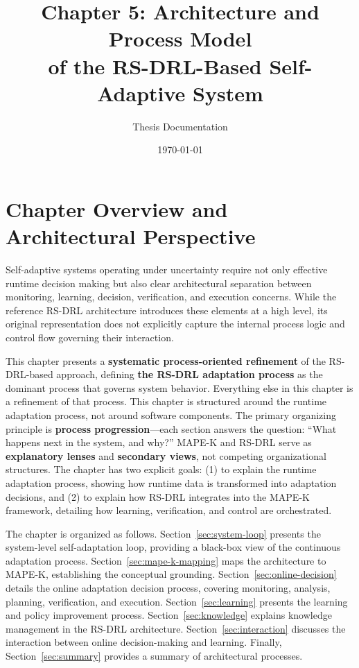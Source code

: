 \documentclass[11pt,a4paper]{article}
\title{Chapter 5: Architecture and Process Model\\of the RS-DRL-Based Self-Adaptive System}
\author{Thesis Documentation}
\date{\today}
\begin{document}
\maketitle


\section{Chapter Overview and Architectural Perspective}
\label{sec:overview}

Self-adaptive systems operating under uncertainty require not only effective runtime decision making but also clear architectural separation between monitoring, learning, decision, verification, and execution concerns. While the reference RS-DRL architecture introduces these elements at a high level, its original representation does not explicitly capture the internal process logic and control flow governing their interaction.

This chapter presents a \textbf{systematic process-oriented refinement} of the RS-DRL-based approach, defining \textbf{the RS-DRL adaptation process} as the dominant process that governs system behavior. Everything else in this chapter is a refinement of that process. This chapter is structured around the runtime adaptation process, not around software components. The primary organizing principle is \textbf{process progression}---each section answers the question: ``What happens next in the system, and why?'' MAPE-K and RS-DRL serve as \textbf{explanatory lenses} and \textbf{secondary views}, not competing organizational structures. The chapter has two explicit goals: (1) to explain the runtime adaptation process, showing how runtime data is transformed into adaptation decisions, and (2) to explain how RS-DRL integrates into the MAPE-K framework, detailing how learning, verification, and control are orchestrated.

The chapter is organized as follows. Section~\ref{sec:system-loop} presents the system-level self-adaptation loop, providing a black-box view of the continuous adaptation process. Section~\ref{sec:mape-k-mapping} maps the architecture to MAPE-K, establishing the conceptual grounding. Section~\ref{sec:online-decision} details the online adaptation decision process, covering monitoring, analysis, planning, verification, and execution. Section~\ref{sec:learning} presents the learning and policy improvement process. Section~\ref{sec:knowledge} explains knowledge management in the RS-DRL architecture. Section~\ref{sec:interaction} discusses the interaction between online decision-making and learning. Finally, Section~\ref{sec:summary} provides a summary of architectural processes.
\end{document}
